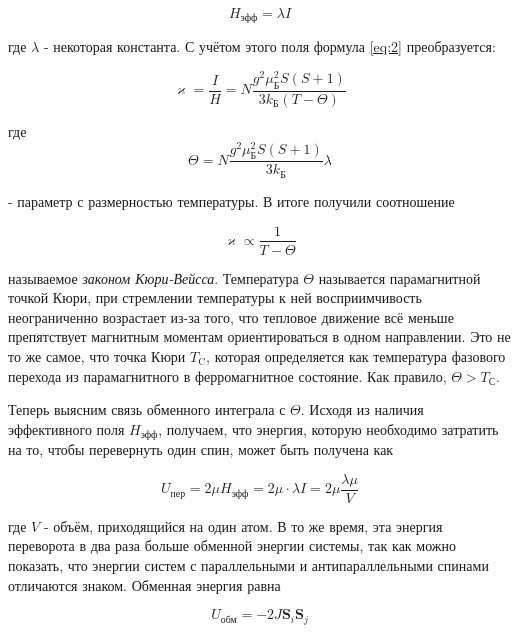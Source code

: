 \documentclass[a4paper,12pt]{article}
\begin{document}
\begin{equation*}
    H_{\text{эфф}} = \lambda I
\end{equation*}

где $\lambda$ - некоторая константа. С учётом этого поля формула \eqref{eq:2} преобразуется:

\begin{equation*}
    \varkappa = \dfrac{I}{H} = N\dfrac{g^2 \mu_{\text{Б}}^2 S(S+1)}{3k_{\text{Б}}(T-\Theta)}
\end{equation*}

где 
\begin{equation*}
    \Theta = N \dfrac{g^2 \mu_{\text{Б}}^2 S(S+1)}{3k_{\text{Б}}}\lambda
\end{equation*}

- параметр с размерностью температуры. В итоге получили соотношение


\begin{equation}\label{eq:3}
    \varkappa \propto \dfrac{1}{T - \Theta}
\end{equation}


называемое \textit{законом Кюри-Вейсса}. Температура $\Theta$ называется парамагнитной точкой Кюри, при стремлении температуры к ней восприимчивость неограниченно возрастает из-за того, что тепловое движение всё меньше препятствует магнитным моментам ориентироваться в одном направлении. Это не то же самое, что точка Кюри $T_\text{C}$, которая определяется как температура фазового перехода из парамагнитного в ферромагнитное состояние. Как правило, $\Theta > T_\text{С}$.


Теперь выясним связь обменного интеграла с $\Theta$. Исходя из наличия эффективного поля $H_{\text{эфф}}$, получаем, что энергия, которую необходимо затратить на то, чтобы перевернуть один спин, может быть получена как 


\begin{equation}\label{eq:4}
    U_{\text{пер}} = 2\mu H_{\text{эфф}} = 2 \mu \cdot \lambda I = 2\mu \dfrac{\lambda \mu}{V}
\end{equation}


где $V$ - объём, приходящийся на один атом. В то же время, эта энергия переворота в два раза больше обменной энергии системы, так как можно показать, что энергии систем с параллельными и антипараллельными спинами отличаются знаком. Обменная энергия равна 

\begin{equation*}
    U_{\text{обм}} = -2J \mathbf{S}_i \mathbf{S}_j
\end{equation*}
\end{document}
